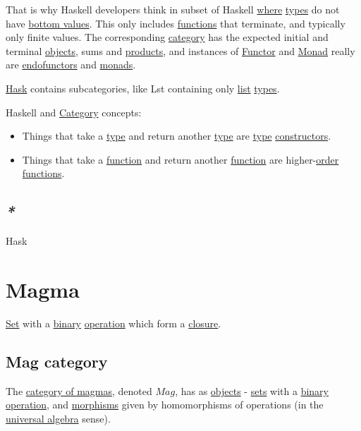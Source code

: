 \documentclass[a4paper,14pt,oneside]{book}
\begin{document}
That is why Haskell developers think in subset of Haskell \hyperref[orgbe7070f]{where} \hyperref[org91cf53a]{types} do not have \hyperref[org7923e7f]{bottom values}. This only includes \hyperref[org98c9592]{functions} that terminate, and typically only finite values. The corresponding \hyperref[org82baa03]{category} has the expected initial and terminal \hyperref[org88e24d2]{objects}, sums and \hyperref[org2b27976]{products}, and instances of \hyperref[orgdd3b6fb]{Functor} and \hyperref[org1b8b304]{Monad} really are \hyperref[org9e7fd30]{endofunctors} and \hyperref[orgc09543f]{monads}.

\hyperref[org9b4a4d9]{Hask} contains subcategories, like Lst containing only \hyperref[orga17c874]{list} \hyperref[org91cf53a]{types}.

Haskell and \hyperref[org82baa03]{Category} concepts:
\begin{itemize}
\item Things that take a \hyperref[orgde40363]{type} and return another \hyperref[orgde40363]{type} are \hyperref[orgde40363]{type} \hyperref[org04dd32d]{constructors}.
\item Things that take a \hyperref[orgc39a15c]{function} and return another \hyperref[orgc39a15c]{function} are higher-\hyperref[orgf08eded]{order} \hyperref[org98c9592]{functions}.
\end{itemize}

\subsection{\emph{*}}
\label{sec:org4e0eb13}

\label{org9b4a4d9}Hask

\section{\label{org0eb54f8}Magma}
\label{sec:org3715d97}
\hyperref[org28abdc9]{Set} with a \hyperref[org1e356fa]{binary} \hyperref[orgf96349c]{operation} which form a \hyperref[orge56923d]{closure}.

\subsection{\label{org7383ca0}Mag category}
\label{sec:org07cad3c}
The \hyperref[orge96a03f]{category of magmas}, denoted \(Mag\), has as \hyperref[org88e24d2]{objects} - \hyperref[org8162ad1]{sets} with a \hyperref[org1e356fa]{binary} \hyperref[orgf96349c]{operation}, and \hyperref[orgfb70910]{morphisms} given by homomorphisms of operations (in the \hyperref[org922178a]{universal algebra} sense).
\end{document}
